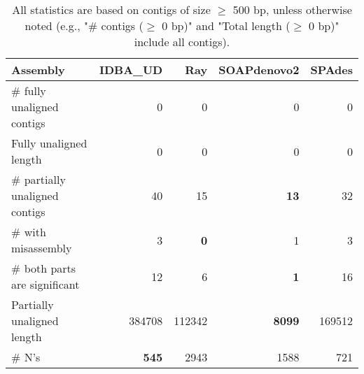 \documentclass[12pt,a4paper]{article}
\begin{document}
\begin{table}[ht]
\begin{center}
\caption{All statistics are based on contigs of size $\geq$ 500 bp, unless otherwise noted (e.g., "\# contigs ($\geq$ 0 bp)" and "Total length ($\geq$ 0 bp)" include all contigs).}
\begin{tabular}{|l*{4}{|r}|}
\hline
Assembly & IDBA\_UD & Ray & SOAPdenovo2 & SPAdes \\ \hline
\# fully unaligned contigs & 0 & 0 & 0 & 0 \\ \hline
Fully unaligned length & 0 & 0 & 0 & 0 \\ \hline
\# partially unaligned contigs & 40 & 15 & {\bf 13} & 32 \\ \hline
\hspace{5mm}\# with misassembly & 3 & {\bf 0} & 1 & 3 \\ \hline
\hspace{5mm}\# both parts are significant & 12 & 6 & {\bf 1} & 16 \\ \hline
Partially unaligned length & 384708 & 112342 & {\bf 8099} & 169512 \\ \hline
\# N's & {\bf 545} & 2943 & 1588 & 721 \\ \hline
\end{tabular}
\end{center}
\end{table}
\end{document}
